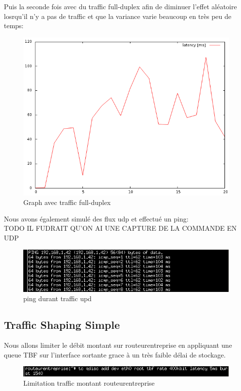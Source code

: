 \documentclass{article}
\begin{document}
Puis la seconde fois avec du traffic full-duplex afin de diminuer l'effet aléatoire losrqu'il n'y a pas de traffic et que la variance varie beaucoup en très peu de temps:
\begin{figure}[h]
  \centering
  \includegraphics[width=\linewidth]{./captures/6-plot-fullduplex.png}
  \caption{Graph avec traffic full-duplex}
  \label{fig:token-bucket}
\end{figure}
\newpage

Nous avons également simulé des flux udp et effectué un ping:\\
TODO IL FUDRAIT QU'ON AI UNE CAPTURE DE LA COMMANDE EN UDP

\begin{figure}[h]
  \centering
  \includegraphics[width=\linewidth]{./captures/10-udp.png}
  \caption{ping durant traffic upd}
  \label{fig:token-bucket}
\end{figure}
\newpage


\subsection{Traffic Shaping Simple}
Nous allons limiter le débit montant sur routeurentreprise en appliquant une queue TBF sur l'interface sortante grace à un très faible délai de stockage.
\begin{figure}[h]
  \centering
  \includegraphics[width=\linewidth]{./captures/11-limite.png}
  \caption{Limitation traffic montant routeurentreprise}
  \label{fig:token-bucket}
\end{figure}
\end{document}
